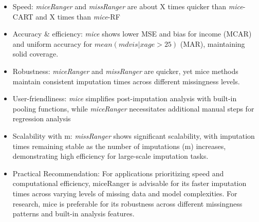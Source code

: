 \documentclass[20pt,margin=1in,innermargin=-4.5in,blockverticalspace=-0.25in]{tikzposter}
\begin{document}
\begin{columns}
{    \begin{itemize}
        \item Speed: \textit{miceRanger} and \textit{missRanger} are  about X times quicker than \textit{mice}-CART and X times than \textit{mice}-RF
        \vspace{-0.5em}
        \item Accuracy \& efficiency: \textit{mice} shows lower MSE and bias for income (MCAR) and uniform accuracy for $mean(mdvis|xage>25)$ (MAR), maintaining solid coverage.
        \vspace{-0.5em}
        \item Robustness: \textit{miceRanger} and \textit{missRanger} are quicker, yet mice methods maintain consistent imputation times across different missingness levels.
        \vspace{-0.5em}
        \item User-friendliness: \textit{mice} simplifies post-imputation analysis with built-in pooling functions, while \textit{miceRanger} necessitates additional manual steps for regression analysis
        \vspace{-0.5em}
        \item Scalability with m: \textit{missRanger} shows significant scalability, with imputation times remaining stable as the number of imputations (m) increases, demonstrating high efficiency for large-scale imputation tasks.
        \vspace{-0.5em}
        \item Practical Recommendation: For applications prioritizing speed and computational efficiency, miceRanger is advisable for its faster imputation times across varying levels of missing data and model complexities. For research, mice is preferable for its robustness across different missingness patterns and built-in analysis features.
    \end{itemize}
    
    \vspace{-1em}
    }
    
\end{columns}
\end{document}
